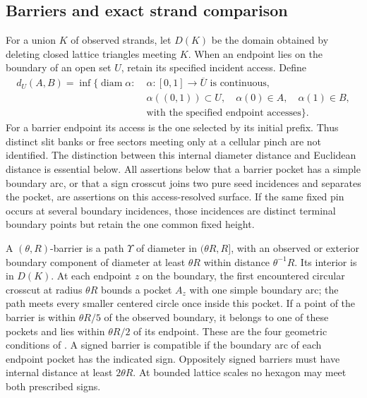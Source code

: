 \subsection{Barriers and exact strand comparison}

For a union \(K\) of observed strands, let \(D(K)\) be the domain obtained
by deleting closed lattice triangles meeting \(K\).  When an endpoint
lies on the boundary of an open set \(U\), retain its specified incident
access.  Define
\[
 \begin{aligned}
 d_U(A,B)=\inf\{\operatorname{diam}\alpha:\;&
   \alpha:[0,1]\longrightarrow\overline U\text{ is continuous},\\
   &\alpha((0,1))\subset U,\quad \alpha(0)\in A,\quad\alpha(1)\in B,\\
   &\text{with the specified endpoint accesses}\}.
 \end{aligned}
\]
For a barrier endpoint its access is the one selected by its initial
prefix.  Thus distinct slit banks or free sectors meeting only at a
cellular pinch are not identified.  The distinction between this internal
diameter distance and Euclidean distance is essential below.
All assertions below that a barrier pocket has a simple boundary arc, or
that a sign crosscut joins two pure seed incidences and separates the
pocket, are assertions on this access-resolved surface.  If the same fixed
pin occurs at several boundary incidences, those incidences are distinct
terminal boundary points but retain the one common fixed height.

A \((\theta,R)\)-barrier is a path \(\Upsilon\) of diameter in
\((\theta R,R]\), with an observed or exterior boundary component of
diameter at least \(\theta R\) within distance \(\theta^{-1}R\).
Its interior is in \(D(K)\). At each endpoint \(z\) on the boundary,
the first encountered circular crosscut at radius \(\theta R\) bounds
a pocket \(A_z\) with one simple boundary arc; the path meets every
smaller centered circle once inside this pocket. If a point of the
barrier is within \(\theta R/5\) of the observed boundary, it belongs
to one of these pockets and lies within \(\theta R/2\) of its endpoint.
These are the four geometric conditions of
\cite[Section 3.4]{SSdiscrete}. A signed barrier is compatible if the
boundary arc of each endpoint pocket has the indicated sign.
Oppositely signed barriers must have internal distance at least
\(2\theta R\). At bounded lattice scales no hexagon may meet both
prescribed signs.

